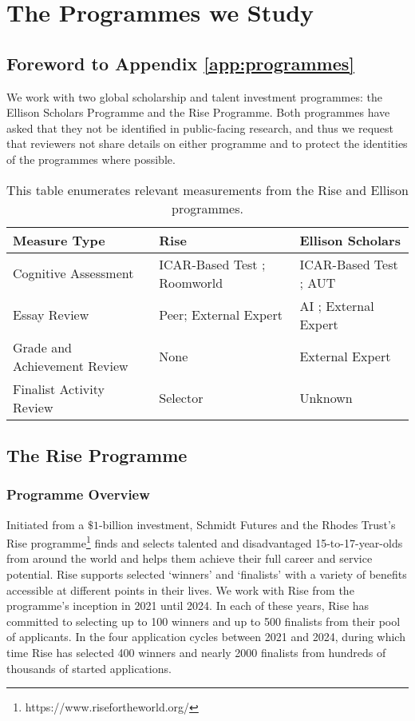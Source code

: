 \chapter{\label{app:programmes}The Programmes we Study}

\minitoc
\section{Foreword to Appendix \ref{app:programmes}}
We work with two global scholarship and talent investment programmes: the Ellison Scholars Programme and the Rise Programme. Both programmes have asked that they not be identified in public-facing research, and thus we request that reviewers not share details on either programme and to protect the identities of the programmes where possible.

\begin{table}[htbp]
    \centering
    \caption{This table enumerates relevant measurements from the Rise and Ellison programmes.}
    \label{tab:measures}
    \begin{tabular}{l | p{} p{}}
        \toprule
        Measure Type & Rise & Ellison Scholars \\
        \midrule
        Cognitive Assessment & ICAR-Based Test \cite{condon2014international}; Roomworld \cite{Dumbalska_Bhatti_Ali_Summerfield_2023} & ICAR-Based Test \cite{condon2014international}; AUT \cite{guilford1967creativity,organisciak_beyond_2023} \\
        Essay Review & Peer; External Expert & AI \cite{xiao2024humanaicollaborativeessayscoring}; External Expert \\
        Grade and Achievement Review & None & External Expert \\
        Finalist Activity Review & Selector & Unknown \\
        \bottomrule
    \end{tabular}
  \end{table}
  
\section{The Rise Programme}\label{ssec:rise}
\subsection{Programme Overview}
Initiated from a $\$1$-billion investment, Schmidt Futures and the Rhodes Trust's Rise programme\footnote{https://www.risefortheworld.org/} finds and selects talented and disadvantaged 15-to-17-year-olds from around the world and helps them achieve their full career and service potential. Rise supports selected `winners' and `finalists' with a variety of benefits accessible at different points in their lives. We work with Rise from the programme's inception in 2021 until 2024. In each of these years, Rise has committed to selecting up to 100 winners and up to 500 finalists from their pool of applicants. In the four application cycles between 2021 and 2024, during which time Rise has selected 400 winners and nearly 2000 finalists from hundreds of thousands of started applications.


